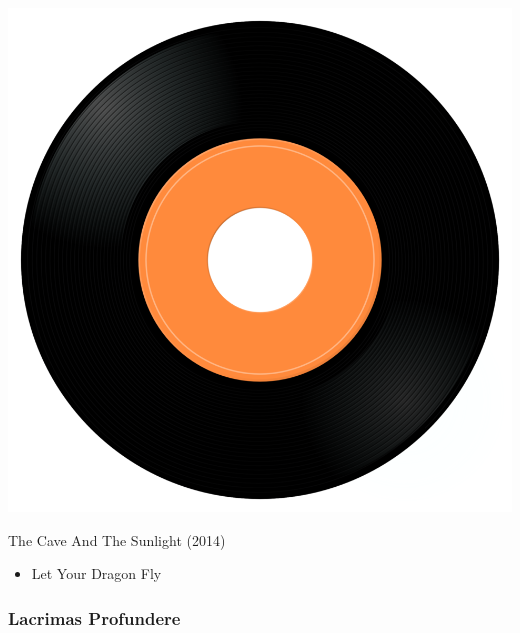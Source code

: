 \begin{minipage}[t]{0.25\textwidth}\vspace{0pt}
\captionsetup{type=figure}
\includegraphics[width=\textwidth]{Images/cover.png}
\caption*{The Cave And The Sunlight (2014)}
\end{minipage}
\begin{minipage}[t]{0.25\textwidth}\vspace{0pt}
\begin{itemize}[nosep,leftmargin=1em,labelwidth=*,align=left]
	\setlength{\itemsep}{0pt}
	\item Let Your Dragon Fly
\end{itemize}
\end{minipage}

\subsubsection{Lacrimas Profundere}

